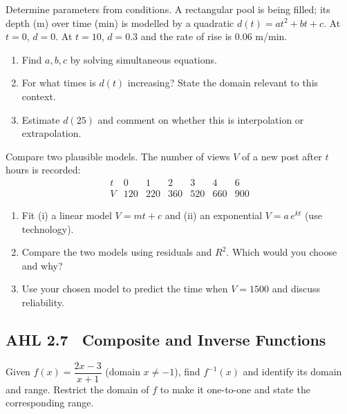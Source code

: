 \documentclass[11pt]{article}
\def\textbf#1{#1}%
\newcommand{\tocsubsection}[1]{\subsection{#1}}
\newcounter{question}
\begin{document}
\begin{question}
\textbf{Determine parameters from conditions.}
A rectangular pool is being filled; its depth (m) over time (min) is modelled by a quadratic $d(t)=at^2+bt+c$.
At $t=0$, $d=0$. At $t=10$, $d=0.3$ and the rate of rise is $0.06$ m/min.
\begin{enumerate}
  \item Find $a,b,c$ by solving simultaneous equations.
  \item For what times is $d(t)$ increasing? State the domain relevant to this context.
  \item Estimate $d(25)$ and comment on whether this is interpolation or extrapolation.
\end{enumerate}
\end{question}

\begin{question}
\textbf{Compare two plausible models.}
The number of views $V$ of a new post after $t$ hours is recorded:
\[
\begin{array}{c|cccccc}
t & 0 & 1 & 2 & 3 & 4 & 6\\\hline
V & 120 & 220 & 360 & 520 & 660 & 900
\end{array}
\]
\begin{enumerate}
  \item Fit (i) a linear model $V=mt+c$ and (ii) an exponential $V=a\,e^{kt}$ (use technology).
  \item Compare the two models using residuals and $R^2$. Which would you choose and why?
  \item Use your chosen model to predict the time when $V=1500$ and discuss reliability.
\end{enumerate}
\end{question}









\tocsubsection{AHL 2.7 \; Composite and Inverse Functions}



\begin{question}
Given $f(x)=\dfrac{2x-3}{x+1}$ (domain $x\neq -1$), find $f^{-1}(x)$ and
identify its domain and range.  Restrict the domain of $f$ to make it
one-to-one and state the corresponding range.
\end{question}
\end{document}

